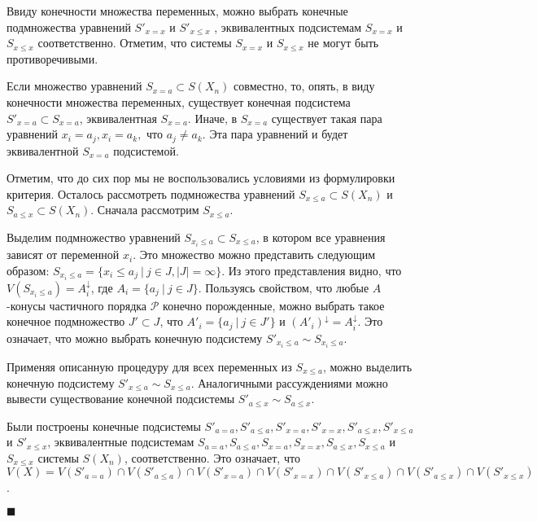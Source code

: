 \documentclass[12pt]{article}
\theoremstyle{break}
\newenvironment{Proof} %
	{\par\noindent{\bf Доказательство.}} %
	{\hfill$\scriptstyle\blacksquare$} %
\def\P{\mathcal{P}}
\begin{document}
\begin{Proof}
			Ввиду конечности множества переменных, можно выбрать конечные подмножества уравнений $S'_{x=x}$ и $S'_{x\leqslant x}$ , эквивалентных подсистемам $S_{x=x}$ и $S_{x\leqslant x}$ соответственно. Отметим, что системы $S_{x=x}$ и $S_{x\leqslant x}$ не могут быть противоречивыми.

			Если множество уравнений $S_{x=a}\subset S(X_n)$ совместно, то, опять, в виду конечности множества переменных, существует конечная подсистема $S'_{x=a}\subset S_{x=a}$, эквивалентная $S_{x=a}.$ Иначе, в $S_{x=a}$  существует такая пара уравнений $x_i=a_j, x_i=a_k,$ что $a_j\neq a_k$. Эта пара уравнений и будет эквивалентной $S_{x=a}$ подсистемой.

			Отметим, что до сих пор мы не воспользовались условиями из формулировки критерия. Осталось рассмотреть подмножества уравнений $S_{x\leqslant a}\subset S(X_n)$ и $S_{a\leqslant x}\subset S(X_n)$. Сначала рассмотрим $S_{x\leqslant a}$.

			Выделим подмножество уравнений $S_{x_i\leqslant a}\subset S_{x\leqslant a}$, в котором все уравнения зависят от переменной $x_i$. Это множество можно представить следующим образом: $S_{x_i\leqslant a}=\{x_i\leqslant a_j\ |\ j\in J, |J| = \infty\}.$ Из этого представления видно, что $V(S_{x_i\leqslant a}) = A_i^{\downarrow}$, где $A_i = \{a_j\ |\ j\in J\}$. Пользуясь свойством, что любые $A$-конусы частичного порядка $\P$ конечно порожденные, можно выбрать такое конечное подмножество $J'\subset J$, что $A'_i = \{a_j\ |\ j\in J'\}$ и $(A'_i)^{\downarrow} = A_i^{\downarrow}.$ Это означает, что можно выбрать конечную подсистему $S'_{x_i\leqslant a}\sim S_{x_i\leqslant a}$.

			Применяя описанную процедуру для всех переменных из $S_{x\leqslant a}$, можно выделить конечную подсистему $S'_{x\leqslant a}\sim S_{x\leqslant a}.$ Аналогичными рассуждениями можно вывести существование конечной подсистемы $S'_{a\leqslant x}\sim S_{a\leqslant x}.$

			Были построены конечные подсистемы $S'_{a=a}, S'_{a\leqslant a}, S'_{x=a}, S'_{x=x}, S'_{a\leqslant x}, S'_{x\leqslant a}$ и $S'_{x\leqslant x}$, эквивалентные подсистемам $S_{a=a}, S_{a\leqslant a}, S_{x=a}, S_{x=x}, S_{a\leqslant x}, S_{x\leqslant a}$ и $S_{x\leqslant x}$ системы $S(X_n)$, соответственно. Это означает, что $V(X) = V(S'_{a=a})\cap V(S'_{a\leqslant a})\cap V(S'_{x=a})\cap V(S'_{x=x})\cap V(S'_{x\leqslant a})\cap V(S'_{a\leqslant x})\cap V(S'_{x\leqslant x})$.


\end{Proof}
\end{document}
